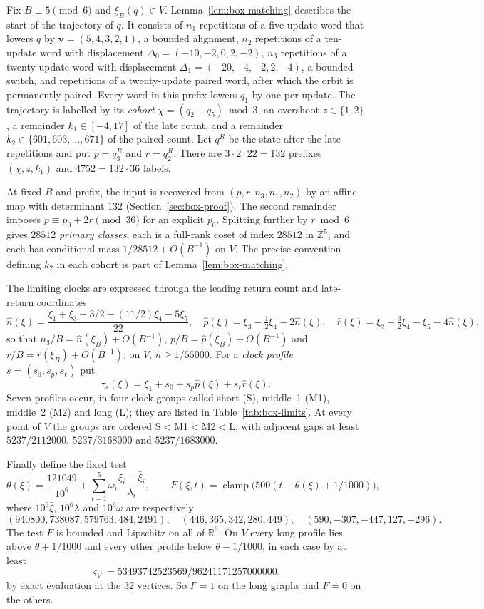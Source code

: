 \documentclass[11pt,reqno]{amsart}
\theoremstyle{remark}
\newcommand{\Z}{\mathbb Z}
\newcommand{\R}{\mathbb R}
\newcommand{\clamp}{\operatorname{clamp}}
\newcommand{\vct}{\boldsymbol v}
\begin{document}
Fix \(B\equiv5\pmod6\) and \(\xi_B(q)\in V\). Lemma~\ref{lem:box-matching} describes the start of the trajectory of \(q\). It consists of \(n_1\) repetitions of a five-update word that lowers \(q\) by \(\vct=(5,4,3,2,1)\), a bounded alignment, \(n_2\) repetitions of a ten-update word with displacement \(\Delta_0=(-10,-2,0,2,-2)\), \(n_3\) repetitions of a twenty-update word with displacement \(\Delta_1=(-20,-4,-2,2,-4)\), a bounded switch, and repetitions of a twenty-update paired word, after which the orbit is permanently paired. Every word in this prefix lowers \(q_1\) by one per update. The trajectory is labelled by its \emph{cohort} \(\chi=(q_2-q_5)\bmod3\), an overshoot \(z\in\{1,2\}\), a remainder \(k_1\in[-4,17]\) of the late count, and a remainder \(k_2\in\{601,603,\ldots,671\}\) of the paired count. Let \(q^R\) be the state after the late repetitions and put \(p=q^R_3\) and \(r=q^R_2\). There are \(3\cdot2\cdot22=132\) prefixes \((\chi,z,k_1)\) and \(4752=132\cdot36\) labels.

At fixed \(B\) and prefix, the input is recovered from \((p,r,n_3,n_1,n_2)\) by an affine map with determinant \(132\) (Section~\ref{sec:box-proof}). The second remainder imposes \(p\equiv p_0+2r\pmod{36}\) for an explicit \(p_0\). Splitting further by \(r\bmod6\) gives \(28512\) \emph{primary classes}; each is a full-rank coset of index \(28512\) in \(\Z^5\), and each has conditional mass \(1/28512+O(B^{-1})\) on \(V\). The precise convention defining \(k_2\) in each cohort is part of Lemma~\ref{lem:box-matching}.

The limiting clocks are expressed through the leading return count and late-return coordinates
\[
 \hat n(\xi)=\frac{\xi_1+\xi_3-3/2-(11/2)\xi_4-5\xi_5}{22},\quad
 \hat p(\xi)=\xi_3-\tfrac12\xi_4-2\hat n(\xi),\quad
 \hat r(\xi)=\xi_2-\tfrac32\xi_4-\xi_5-4\hat n(\xi),
\]
so that \(n_3/B=\hat n(\xi_B)+O(B^{-1})\), \(p/B=\hat p(\xi_B)+O(B^{-1})\) and \(r/B=\hat r(\xi_B)+O(B^{-1})\); on \(V\), \(\hat n\ge1/55000\). For a \emph{clock profile} \(s=(s_0,s_p,s_r)\) put
\[
 \tau_s(\xi)=\xi_1+s_0+s_p\hat p(\xi)+s_r\hat r(\xi).
\]
Seven profiles occur, in four clock groups called short (S), middle~1 (M1), middle~2 (M2) and long (L); they are listed in Table~\ref{tab:box-limits}. At every point of \(V\) the groups are ordered S\(<\)M1\(<\)M2\(<\)L, with adjacent gaps at least \(5237/2112000\), \(5237/3168000\) and \(5237/1683000\).

Finally define the fixed test
\[
 \theta(\xi)=\frac{121049}{10^6}+\sum_{i=1}^5 \omega_i\frac{\xi_i-\bar\xi_i}{\lambda_i},
 \qquad F(\xi,t)=\clamp\bigl(500(t-\theta(\xi)+1/1000)\bigr),
\]
where \(10^6\bar\xi\), \(10^6\lambda\) and \(10^6\omega\) are respectively
\[
 (940800,738087,579763,484,2491),\quad(446,365,342,280,449),\quad
 (590,-307,-447,127,-296).
\]
The test \(F\) is bounded and Lipschitz on all of \(\R^6\). On \(V\) every long profile lies above \(\theta+1/1000\) and every other profile below \(\theta-1/1000\), in each case by at least
\[
 \varsigma_V=53493742523569/96241171257000000,
\]
by exact evaluation at the \(32\) vertices. So \(F=1\) on the long graphs and \(F=0\) on the others.
\end{document}
